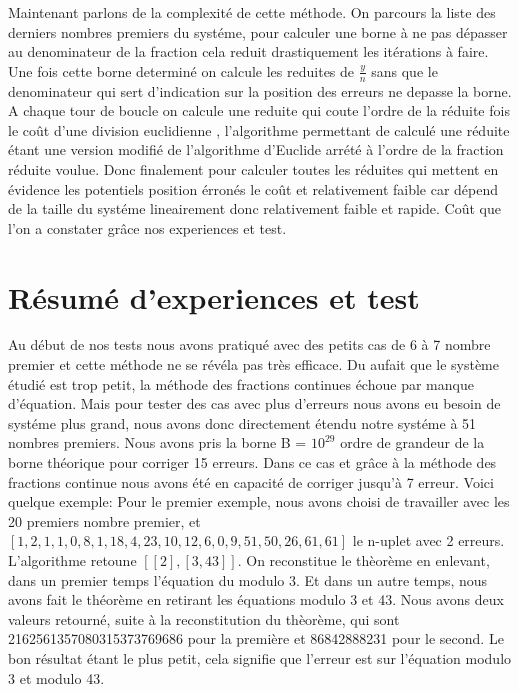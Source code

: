 \documentclass[a4paper, 11pt]{report}
\begin{document}
\newpage
Maintenant parlons de la complexité de cette méthode. 
On parcours la liste des derniers nombres premiers du systéme, pour calculer une borne à ne pas dépasser au denominateur de la fraction cela reduit drastiquement les itérations à faire.
Une fois cette borne determiné on calcule les reduites de  $\frac{y}{n}$ sans que le denominateur qui sert d'indication sur la position des erreurs ne depasse la borne.
A chaque tour de boucle on calcule une reduite qui coute l'ordre de la réduite fois le coût d'une division euclidienne  ,
l'algorithme permettant de calculé une réduite étant une version modifié de l'algorithme d'Euclide arrété à l'ordre de la fraction réduite voulue.
Donc finalement pour calculer toutes les réduites qui mettent en évidence les potentiels position érronés le coût et relativement faible car dépend de la taille du systéme lineairement donc relativement faible et rapide.
Coût que l'on a constater grâce  nos experiences et test. \newline





\newpage
\section{Résumé d'experiences et test}
Au début de nos tests nous avons pratiqué avec des petits cas de 6 à 7 nombre premier et cette méthode ne se révéla pas très efficace. Du aufait que le système étudié est trop petit, la méthode des fractions continues échoue par manque d'équation.
Mais pour tester des cas avec plus d'erreurs nous avons eu besoin de systéme plus grand, nous avons donc directement étendu notre systéme à 51 nombres premiers.
Nous avons pris la borne B = $10^{29}$ ordre de grandeur de la borne théorique pour corriger 15 erreurs.
Dans ce cas et grâce à la méthode des fractions continue nous avons été en capacité de corriger jusqu'à 7 erreur. \newline
Voici quelque exemple: \newline 
Pour le premier exemple, nous avons choisi de travailler avec les 20 premiers nombre premier, et $[1, 2, 1, 1, 0, 8, 1, 18, 4, 23, 10, 12, 6, 0, 9, 51, 50, 26, 61, 61]$ le n-uplet avec 2 erreurs.
L'algorithme retoune $[[2], [3, 43]]$. On reconstitue le thèorème en enlevant, dans un premier temps l'équation du modulo 3. Et dans un autre temps, nous avons fait le théorème en retirant 
les équations modulo 3 et 43. Nous avons deux valeurs retourné, suite à la reconstitution du thèorème, qui sont 2162561357080315373769686 pour la première et 86842888231 pour le second. Le bon résultat étant le plus petit, cela 
signifie que l'erreur est sur l'équation modulo 3 et modulo 43. \newline
\newline
\end{document}
